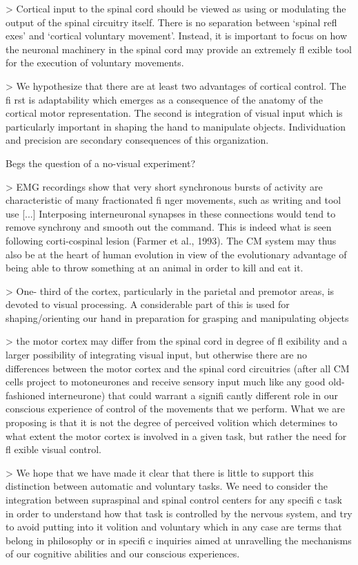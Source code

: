 \documentclass[../main.tex]{subfiles}
\begin{document}
{{{> Cortical input to the spinal cord should be viewed as using or modulating the output of the spinal circuitry itself. There is no separation between ‘spinal refl exes’ and ‘cortical voluntary movement’. Instead, it is important to focus on how the  neuronal  machinery  in  the  spinal  cord  may  provide  an  extremely  fl  exible  tool  for  the  execution of voluntary movements.

> We  hypothesize that there are at least two advantages of cortical control. The fi rst is adaptability which emerges as a consequence of the anatomy of the cortical motor representation. The second is integration of visual input which is particularly important in shaping the hand to manipulate   objects.   Individuation   and   precision   are   secondary   consequences   of   this   organization. 

Begs the question of a no-visual experiment?

> EMG recordings show  that  very  short  synchronous  bursts  of  activity  are  characteristic  of  many  fractionated  fi nger movements, such as writing and tool use [...]  Interposing interneuronal synapses in these connections would tend to remove synchrony and smooth out the command. This is indeed what is seen following corti-cospinal lesion (Farmer et al., 1993). The CM system may thus also be at the heart of human evolution  in  view  of  the  evolutionary  advantage  of  being  able  to  throw  something  at  an  animal in order to kill and eat it.

> One- third of the cortex, particularly in the parietal and premotor areas, is devoted to visual processing. A considerable part of this is used for shaping/orienting our hand in preparation for grasping and manipulating objects 

> the  motor  cortex  may  differ  from  the  spinal  cord  in  degree of fl exibility and a larger possibility of integrating visual input, but otherwise there are no differences between the motor cortex and the spinal cord circuitries (after all CM cells project  to  motoneurones  and  receive  sensory  input  much  like  any  good  old-  fashioned interneurone) that could warrant a signifi cantly different role in our conscious experience of control of the movements that we perform. What we are proposing is that it is not the degree of perceived volition which determines to what extent the motor cortex is involved in a given task, but rather the need for fl exible visual control. 

> We hope that we have made it clear that there is little to support this distinction between automatic and voluntary tasks. We need to consider the integration between  supraspinal  and  spinal  control  centers  for  any  specifi  c  task  in  order  to  understand  how that task is controlled by the nervous system, and try to avoid putting into it volition and voluntary which in any case are terms that belong in philosophy or in specifi c inquiries aimed at unravelling the mechanisms of our cognitive abilities and our conscious experiences. 

}}}
\end{document}
